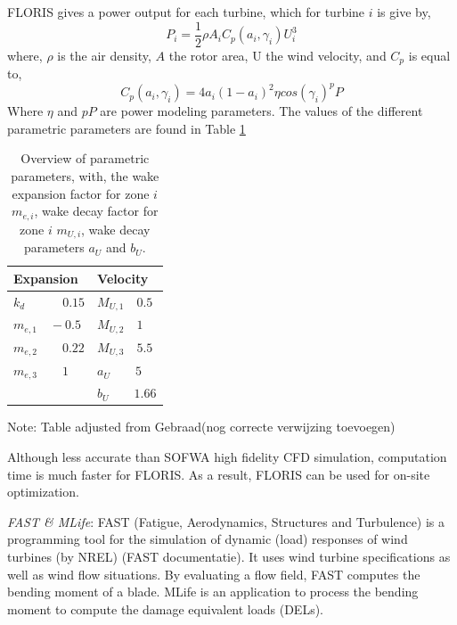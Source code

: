 \documentclass[twoside,twocolumn]{article}
\begin{document}
 FLORIS gives a power output for each turbine, which for turbine $i$ is give by,
\begin{equation}
\label{eq:P}
P_i = \frac{1}{2} \rho A_i C_p(a_i, \gamma_i)U_i^3
\end{equation}
where, $\rho$ is the air density, $A$ the rotor area, U the wind velocity, and $C_p$ is equal to,
\begin{equation}
\label{eq:Cp}
C_p(a_i, \gamma_i) = 4a_i(1-a_i)^2 \eta cos(\gamma_i)^pP
\end{equation}
Where $\eta$ and $pP$ are power modeling parameters.
The values of the different parametric parameters are found in Table \ref{tab:para}
\begin{table}[h]
	\label{tab:para}
	\caption{Overview of parametric parameters, with, the wake expansion factor for zone $i$ $m_{e,i}$, wake decay factor for zone $i$ $m_{U,i}$, wake decay parameters $a_U$ and $b_U$.}
	\centering
	\begin{tabular}{ll}
	\hline
	Expansion & Velocity  \\ 
	\hline
	$k_d \qquad \quad 0.15$ & $M_{U,1} \quad 0.5$ \\
	$m_{e,1} \quad -0.5$ & $M_{U,2} \quad 1$ \\
	$m_{e,2} \qquad 0.22$ & $M_{U,3} \quad 5.5$ \\
	$m_{e,3} \qquad 1$ & $a_U \qquad 5$ \\
	& $b_U \qquad 1.66$ \\
	\hline
	\end{tabular}

Note: Table adjusted from Gebraad(nog correcte verwijzing toevoegen)
\end{table}

 Although less accurate than  SOFWA high fidelity CFD simulation, computation time is much faster for FLORIS. As a result, FLORIS can be used for on-site optimization. 



\textit{FAST \& MLife}: FAST (Fatigue, Aerodynamics, Structures and Turbulence) is a programming tool for the simulation of dynamic (load) responses of wind turbines (by NREL) (FAST documentatie). It uses wind turbine specifications as well as wind flow situations. By evaluating a flow field, FAST computes the bending moment of a blade. MLife is an application to process the bending moment to compute the damage equivalent loads (DELs). 
\end{document}
